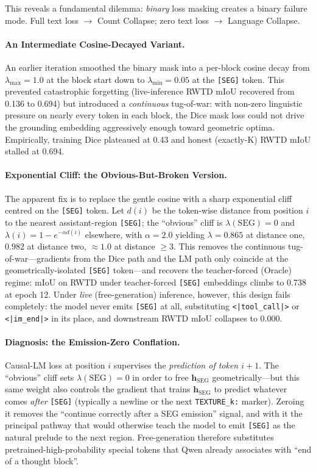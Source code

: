 \documentclass{article}
\begin{document}
This reveals a fundamental dilemma: \emph{binary} loss masking creates a binary failure mode. Full text loss $\to$ Count Collapse; zero text loss $\to$ Language Collapse.

\paragraph{An Intermediate Cosine-Decayed Variant.}
An earlier iteration smoothed the binary mask into a per-block cosine decay from $\lambda_{\max} = 1.0$ at the block start down to $\lambda_{\min} = 0.05$ at the \texttt{[SEG]} token. This prevented catastrophic forgetting (live-inference RWTD mIoU recovered from 0.136 to 0.694) but introduced a \emph{continuous} tug-of-war: with non-zero linguistic pressure on nearly every token in each block, the Dice mask loss could not drive the grounding embedding aggressively enough toward geometric optima. Empirically, training Dice plateaued at 0.43 and honest (exactly-K) RWTD mIoU stalled at 0.694.

\paragraph{Exponential Cliff: the Obvious-But-Broken Version.}
The apparent fix is to replace the gentle cosine with a sharp exponential cliff centred on the \texttt{[SEG]} token. Let $d(i)$ be the token-wise distance from position $i$ to the nearest assistant-region \texttt{[SEG]}; the ``obvious'' cliff is $\lambda(\text{SEG}) = 0$ and $\lambda(i) = 1 - e^{-\alpha d(i)}$ elsewhere, with $\alpha = 2.0$ yielding $\lambda = 0.865$ at distance one, $0.982$ at distance two, $\approx 1.0$ at distance $\geq 3$. This removes the continuous tug-of-war---gradients from the Dice path and the LM path only coincide at the geometrically-isolated \texttt{[SEG]} token---and recovers the teacher-forced (Oracle) regime: mIoU on RWTD under teacher-forced \texttt{[SEG]} embeddings climbs to 0.738 at epoch 12. Under \emph{live} (free-generation) inference, however, this design fails completely: the model never emits \texttt{[SEG]} at all, substituting \texttt{<|tool\_call|>} or \texttt{<|im\_end|>} in its place, and downstream RWTD mIoU collapses to 0.000.

\paragraph{Diagnosis: the Emission-Zero Conflation.}
Causal-LM loss at position $i$ supervises the \emph{prediction of token $i{+}1$}. The ``obvious'' cliff sets $\lambda(\text{SEG}) = 0$ in order to free $\mathbf{h}_{\text{SEG}}$ geometrically---but this same weight also controls the gradient that trains $\mathbf{h}_{\text{SEG}}$ to predict whatever comes \emph{after} \texttt{[SEG]} (typically a newline or the next \texttt{TEXTURE\_k:} marker). Zeroing it removes the ``continue correctly after a SEG emission'' signal, and with it the principal pathway that would otherwise teach the model to emit \texttt{[SEG]} as the natural prelude to the next region. Free-generation therefore substitutes pretrained-high-probability special tokens that Qwen already associates with ``end of a thought block''.
\end{document}
